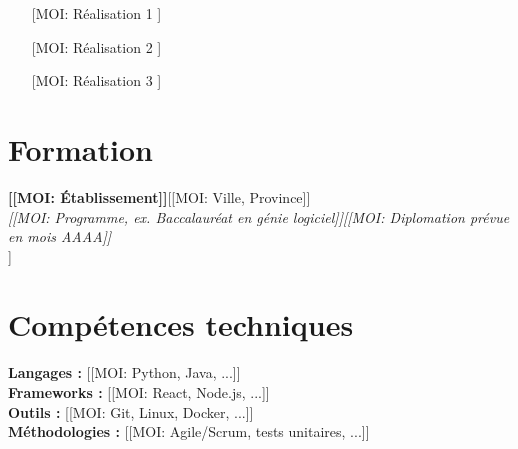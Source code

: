 \begin{itemize}
  \item [[MOI: Réalisation 1]]
  \item [[MOI: Réalisation 2]]
  \item [[MOI: Réalisation 3]]
\end{itemize}

\section{Formation}

\textbf{[[MOI: Établissement]]}\hfill [[MOI: Ville, Province]]\\
\textit{[[MOI: Programme, ex. Baccalauréat en génie logiciel]]}\hfill\textit{[[MOI: Diplomation prévue en mois AAAA]]}\\
[[MOI: Crédits complétés, moyenne, prix… ou supprimer cette ligne]]

\section{Compétences techniques}

\textbf{Langages :} [[MOI: Python, Java, ...]]\\[2.5pt]
\textbf{Frameworks :} [[MOI: React, Node.js, ...]]\\[2.5pt]
\textbf{Outils :} [[MOI: Git, Linux, Docker, ...]]\\[2.5pt]
\textbf{Méthodologies :} [[MOI: Agile/Scrum, tests unitaires, ...]]


